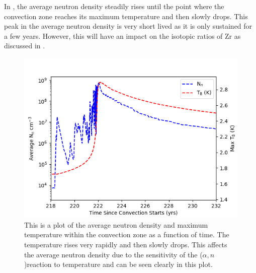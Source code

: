 \documentclass[fleqn,usenatbib]{mnras}
\begin{document}
In , the average neutron density steadily rises until the point where the convection zone reaches its maximum temperature and then slowly drops. This peak in the average neutron density is very short lived as it is only sustained for a few years. However, this will have an impact on the isotopic ratios of Zr as discussed in .

\begin{figure}
  \includegraphics[width=\columnwidth]{figs/Neutron_Density_Time.png}
  \caption{This is a plot of the average neutron density and maximum temperature within the convection zone as a function of time. The temperature rises very rapidly and then slowly drops. This affects the average neutron density due to the sensitivity of the \neon[22]($\alpha,n$)\magnesium[25] reaction to temperature and can be seen clearly in this plot.} 
\end{figure}
\end{document}
